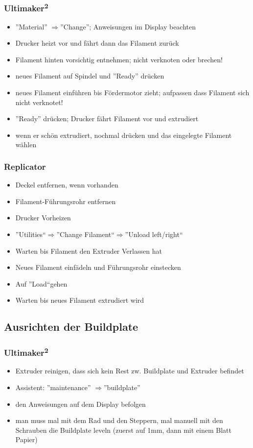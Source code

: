 \documentclass{\basedir/fablab-document}
\newcommand{\ts}[1]{\textsuperscript{#1}}
\newcommand{\ra}{$\Rightarrow$}
\begin{document}
\subsubsection{Ultimaker\ts2}
\begin{itemize}
    \item ''Material'' \ra ''Change''; Anweisungen im Display beachten
    \item Drucker heizt vor und fährt dann das Filament zurück
    \item Filament hinten vorsichtig entnehmen; nicht verknoten oder brechen!
    \item neues Filament auf Spindel und ''Ready'' drücken
    \item neues Filament einführen bis Fördermotor zieht; aufpassen dass Filament sich nicht verknotet!
    \item ''Ready'' drücken; Drucker fährt Filament vor und extrudiert
    \item wenn er schön extrudiert, nochmal drücken und das eingelegte Filament wählen
\end{itemize}

\subsubsection{Replicator}
\begin{itemize}
	\item Deckel entfernen, wenn vorhanden
	\item Filament-Führungsrohr entfernen
	\item Drucker Vorheizen
	\item ''Utilities``\ra ''Change Filament``\ra ''Unload left/right``
	\item Warten bis Filament den Extruder Verlassen hat
	\item Neues Filament einfädeln und Führungsrohr einstecken
	\item Auf ''Load``gehen
	\item Warten bis neues Filament extrudiert wird
\end{itemize}

\subsection{Ausrichten der Buildplate}

\subsubsection{Ultimaker\ts2}
\begin{itemize}
\item Extruder reinigen, dass sich kein Rest zw. Buildplate und Extruder befindet
\item Assistent: ''maintenance'' \ra ''buildplate''
\item den Anweisungen auf dem Display befolgen
\item man muss mal mit dem Rad und den Steppern, mal manuell mit den Schrauben die Buildplate leveln (zuerst auf 1mm, dann mit einem Blatt Papier)
\end{itemize}
\end{document}

